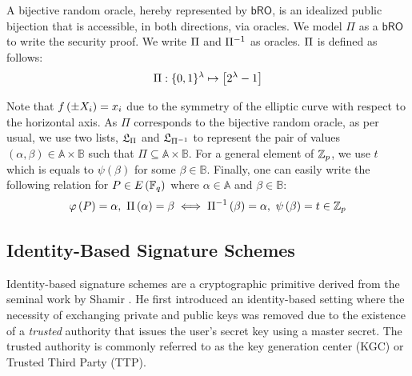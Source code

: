 \documentclass[version=submission, floatrow]{iacrcc}
\begin{document}
\begin{definition}
A bijective random oracle, hereby represented by $\mathsf{bRO}$, is an idealized public bijection that is accessible, in both directions, via oracles. We model $\Pi$ as a $\mathsf{bRO}$ to write the security proof. We write $\Pi$ and $\Pi^{-1}$ as oracles. $\Pi$ is defined as follows:\[
\Pi: \{0,1\}^{\lambda} \mapsto \left[2^{\lambda}-1\right]
\]

Note that $f\left(\pm X_{i}\right) = x_{i}$ due to the symmetry of the elliptic curve with respect to the horizontal axis. As $\Pi$ corresponds to the bijective random oracle, as per usual, we use two lists, $\mathfrak{L}_{\Pi}$ and $\mathfrak{L}_{\Pi^{-1}}$ to represent the pair of values $\left(\alpha, \beta\right) \in \mathbb{A} \times \mathbb{B}$ such that $\Pi \subseteq \mathbb{A} \times \mathbb{B}$. For a general element of $\mathbb{Z}_{p}$, we use $t$ which is equals to $\psi\left(\beta\right)$ for some $\beta \in \mathbb{B}$. Finally, one can easily write the following relation for $P \in E \left(\mathbb{F}_{q}\right)$ where $\alpha \in \mathbb{A}$ and $\beta \in \mathbb{B}$:\[
    \varphi\left(P\right) = \alpha,\ \Pi\left(\alpha\right) = \beta \iff \Pi^{-1}\left(\beta\right) = \alpha,\ \psi\left(\beta\right) = t \in \Zp
\]
\end{definition}

\subsection{Identity-Based Signature Schemes}

Identity-based signature schemes are a cryptographic primitive derived from the seminal work by Shamir \cite{Shamir1985}. He first introduced an identity-based setting where the necessity of exchanging private and public keys was removed due to the existence of a \emph{trusted} authority that issues the user's secret key using a master secret. The trusted authority is commonly referred to as the key generation center (KGC) or Trusted Third Party (TTP).
\end{document}
